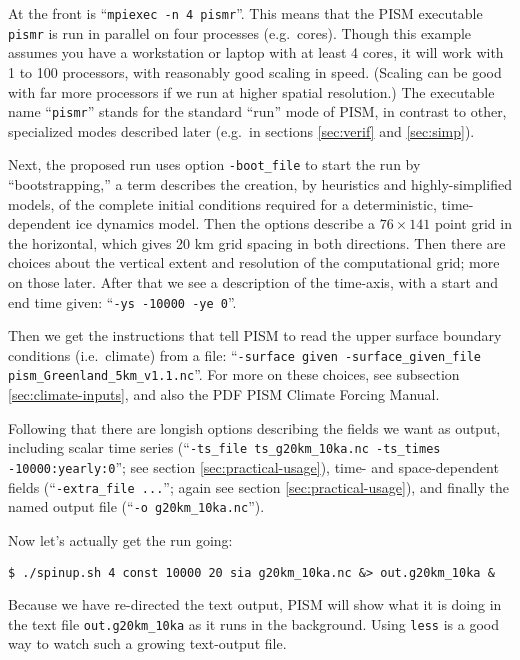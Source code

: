 At the front is ``\texttt{mpiexec -n 4 pismr}''.  This means that the PISM executable \texttt{pismr} is run in parallel on four processes (e.g.~cores).  Though this example assumes you have a workstation or laptop with at least 4 cores, it will work with 1 to 100 processors, with reasonably good scaling in speed.  (Scaling can be good with far more processors if we run at higher spatial resolution.)  The executable name ``\texttt{pismr}'' stands for the standard ``run'' mode of PISM, in contrast to other, specialized modes described later (e.g.~in sections \ref{sec:verif} and \ref{sec:simp}).

Next, the proposed run uses option \texttt{-boot_file} to start the run by ``bootstrapping,'' a term describes the creation, by heuristics and highly-simplified models, of the complete initial conditions required for a deterministic, time-dependent ice dynamics model.  Then the options describe a $76\times 141$ point grid in the horizontal, which gives 20 km grid spacing in both directions.  Then there are choices about the vertical extent and resolution of the computational grid; more on those later.  After that we see a description of the time-axis, with a start and end time given: ``\texttt{-ys -10000 -ye 0}''.

Then we get the instructions that tell PISM to read the upper surface boundary conditions (i.e.~climate) from a file: ``\texttt{-surface given -surface_given_file pism_Greenland_5km_v1.1.nc}''.  For more on these choices, see subsection \ref{sec:climate-inputs}, and also the PDF PISM Climate Forcing Manual.

Following that there are longish options describing the fields we want as output, including scalar time series (``\texttt{-ts_file ts_g20km_10ka.nc -ts_times -10000:yearly:0}''; see section \ref{sec:practical-usage}), time- and space-dependent fields (``\texttt{-extra_file ...}''; again see section \ref{sec:practical-usage}), and finally the named output file (``\texttt{-o g20km_10ka.nc}'').

Now let's actually get the run going:
\begin{verbatim}
$ ./spinup.sh 4 const 10000 20 sia g20km_10ka.nc &> out.g20km_10ka &
\end{verbatim}
\noindent Because we have re-directed the text output, PISM will show what it is doing in the text file \texttt{out.g20km_10ka} as it runs in the background.  Using \texttt{less} is a good way to watch such a growing text-output file.



